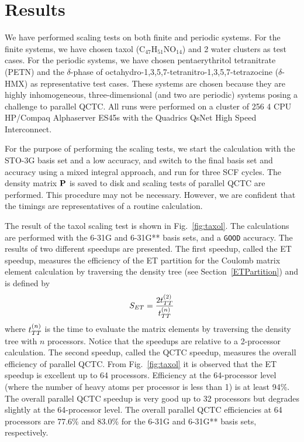 \commentoutA{\documentclass[prl,aps,twocolumn,twocolumngrid,superbib]{revtex4}}
\begin{document}
\section{Results}
\label{results}
We have performed scaling tests on both finite and periodic
systems. For the finite systems, we have chosen taxol
(C$_{47}$H$_{51}$NO$_{14}$) and 2 water clusters as test cases. For
the periodic systems, we have chosen pentaerythritol tetranitrate
(PETN)\cite{CGan04A} and the $\delta$-phase of
octahydro-1,3,5,7-tetranitro-1,3,5,7-tetrazocine
($\delta$-HMX)\cite{JPLewis00} as representative test cases. These
systems are chosen because they are highly inhomogeneous,
three-dimensional (and two are periodic) systems posing a challenge to
parallel QCTC. All runs were performed on a cluster of 256 4 CPU
HP/Compaq Alphaserver ES45s with the Quadrics QsNet High Speed
Interconnect.

For the purpose of performing the scaling tests, we start the
calculation with the STO-3G basis set and a low accuracy, and switch
to the final basis set and accuracy using a mixed integral approach,
and run for three SCF cycles. The density matrix ${\bf P}$ is saved to
disk and scaling tests of parallel QCTC are performed. This procedure
may not be necessary. However, we are confident that the timings are
representatives of a routine calculation.

The result of the taxol scaling test is shown in Fig.~\ref{fig:taxol}.
The calculations are performed with the 6-31G and 6-31G** basis sets,
and a {\tt GOOD} accuracy\cite{CTymczak04a}.  The results of two
different speedups are presented.  The first speedup, called the ET
speedup, measures the efficiency of the ET partition for the Coulomb
matrix element calculation by traversing the density tree (see
Section~\ref{ETPartition}) and is defined by
\begin{equation}
S_{ET} = \frac{2t_{TT}^{(2)}}{t_{TT}^{(n)}}
\end{equation}
where $t_{TT}^{(n)}$ is the time to evaluate the matrix elements by
traversing the density tree with $n$ processors. Notice that the
speedups are relative to a 2-processor calculation.  The second
speedup, called the QCTC speedup, measures the overall efficiency of
parallel QCTC.  From Fig.~\ref{fig:taxol} it is observed that the ET
speedup is excellent up to 64 processors. Efficiency at the
64-processor level (where the number of heavy atoms per processor is
less than 1) is at least 94\%.
The overall parallel QCTC speedup is very good up to 32 processors but
degrades slightly at the 64-processor level.  The overall parallel
QCTC efficiencies at 64 processors are
77.6\% and 83.0\% for the 6-31G and 6-31G** basis sets, respectively.
\end{document}

